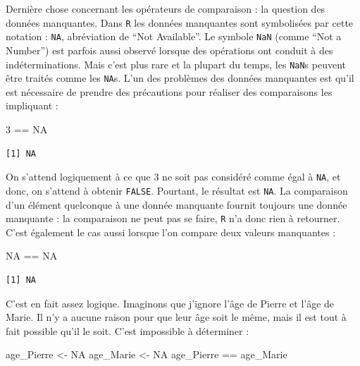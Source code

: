 \documentclass[
  letterpaper,
  DIV=11,
  numbers=noendperiod]{scrreprt}
\newenvironment{Shaded}{\begin{snugshade}}{\end{snugshade}}
\newcommand{\ConstantTok}[1]{\textcolor[rgb]{0.56,0.35,0.01}{#1}}
\newcommand{\DecValTok}[1]{\textcolor[rgb]{0.68,0.00,0.00}{#1}}
\newcommand{\NormalTok}[1]{\textcolor[rgb]{0.00,0.23,0.31}{#1}}
\newcommand{\OtherTok}[1]{\textcolor[rgb]{0.00,0.23,0.31}{#1}}
\newcommand{\SpecialCharTok}[1]{\textcolor[rgb]{0.37,0.37,0.37}{#1}}
\begin{document}
Dernière chose concernant les opérateurs de comparaison : la question
des données manquantes. Dans \texttt{R} les données manquantes sont
symbolisées par cette notation : \texttt{NA}, abréviation de ``Not
Available''. Le symbole \texttt{NaN} (comme ``Not a Number'') est
parfois aussi observé lorsque des opérations ont conduit à des
indéterminations. Mais c'est plus rare et la plupart du temps, les
\texttt{NaN}s peuvent être traités comme les \texttt{NA}s. L'un des
problèmes des données manquantes est qu'il est nécessaire de prendre des
précautions pour réaliser des comparaisons les impliquant :

\begin{Shaded}
\begin{Highlighting}[]
\DecValTok{3} \SpecialCharTok{==} \ConstantTok{NA}
\end{Highlighting}
\end{Shaded}

\begin{verbatim}
[1] NA
\end{verbatim}

On s'attend logiquement à ce que 3 ne soit pas considéré comme égal à
\texttt{NA}, et donc, on s'attend à obtenir \texttt{FALSE}. Pourtant, le
résultat est \texttt{NA}. La comparaison d'un élément quelconque à une
donnée manquante fournit toujours une donnée manquante : la comparaison
ne peut pas se faire, \texttt{R} n'a donc rien à retourner. C'est
également le cas aussi lorsque l'on compare deux valeurs manquantes :

\begin{Shaded}
\begin{Highlighting}[]
\ConstantTok{NA} \SpecialCharTok{==} \ConstantTok{NA}
\end{Highlighting}
\end{Shaded}

\begin{verbatim}
[1] NA
\end{verbatim}

C'est en fait assez logique. Imaginons que j'ignore l'âge de Pierre et
l'âge de Marie. Il n'y a aucune raison pour que leur âge soit le même,
mais il est tout à fait possible qu'il le soit. C'est impossible à
déterminer :

\begin{Shaded}
\begin{Highlighting}[]
\NormalTok{age\_Pierre }\OtherTok{\textless{}{-}} \ConstantTok{NA}
\NormalTok{age\_Marie }\OtherTok{\textless{}{-}} \ConstantTok{NA}
\NormalTok{age\_Pierre }\SpecialCharTok{==}\NormalTok{ age\_Marie}
\end{Highlighting}
\end{Shaded}
\end{document}
